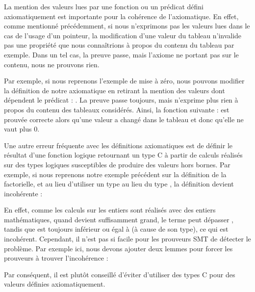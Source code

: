 

La mention des valeurs lues par une fonction ou un prédicat défini
axiomatiquement est importante pour la cohérence de l'axiomatique. En effet,
comme mentionné précédemment, si nous n'exprimons pas les valeurs lues dans le
cas de l'usage d'un pointeur, la modification d'une valeur du tableau n'invalide
pas une propriété que nous connaîtrions à propos du contenu du tableau par
exemple. Dans un tel cas, la preuve passe, mais l'axiome ne portant pas sur le
contenu, nous ne prouvons rien.



Par exemple, si nous reprenons l'exemple de mise à zéro, nous pouvons modifier
la définition de notre axiomatique en retirant la mention des valeurs dont
dépendent le prédicat : . La preuve passe toujours,
mais n'exprime plus rien à propos du contenu des tableaux considérés.
Ainsi, la fonction suivante :
est prouvée correcte alors qu'une valeur a changé dans le tableau et donc qu'elle
ne vaut plus 0.




Une autre erreur fréquente avec les définitions axiomatiques est de définir le
résultat d'une fonction logique retournant un type C à partir de calculs réalisés
sur des types logiques susceptibles de produire des valeurs hors bornes. Par exemple,
si nous reprenons notre exemple précédent sur la définition de la factorielle,
et au lieu d'utiliser un type  au lieu du type
, la définition devient incohérente :




En effet, comme les calculs sur les entiers sont réalisés avec des entiers
mathématiques, quand  devient suffisamment grand, le terme
 peut dépasser , tandis que
 est toujours inférieur ou égal à 
(à cause de son type), ce qui est incohérent. Cependant, il n'est pas si
facile pour les prouveurs SMT de détecter le problème. Par exemple
ici, nous devons ajouter deux lemmes pour forcer les prouveurs à trouver
l'incohérence :






Par conséquent, il est plutôt conseillé d'éviter d'utiliser des types C pour
des valeurs définies axiomatiquement.


